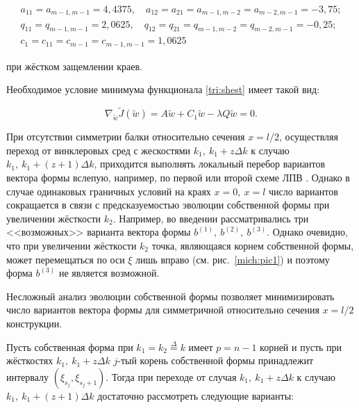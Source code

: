 $$

\begin{array}{l}

 a_{11}=a_{m-1,m-1}=4,4375,\quad  a_{12}=a_{21}=a_{m-1,m-2}=a_{m-2,m-1}=-3,75;

\\

q_{11}=q_{m-1,m-1}=2,0625,\quad q_{12}=q_{21}=q_{m-1,m-2}=q_{m-2,m-1}=-0,25;

\\

c_1=c_{11}=c_{m-1}=c_{m-1,m-1}=1,0625

\end{array}

$$

при жёстком защемлении краев.



Необходимое условие минимума функционала \eqref{tri:shest} имеет такой вид:

$$

\nabla_{\tilde{w}}\tilde{J}(\tilde{w})=A\tilde{w}+C_1\tilde{w}-\lambda Q\tilde{w}=0.

$$



При отсутствии симметрии балки относительно сечения $x=l/2$, осуществляя переход от винклеровых сред с жескостями $k_1,\ k_1+z\Delta k$ к случаю $k_1,\ k_1+(z+1)\Delta k$, приходится выполнять локальный перебор вариантов вектора формы вслепую, например, по первой или второй схеме ЛПВ \cite{mich-1}. Однако в случае одинаковых граничных условий на краях $x=0,\ x=l$ число вариантов сокращается в связи с предсказуемостью эволюции собственной формы при увеличении жёсткости $k_2$. Например, во введении рассматривались три <<возможных>> варианта вектора формы $b^{(1)},\ b^{(2)},\ b^{(3)}$. Однако очевидно, что при увеличении жёсткости $k_2$ точка, являющаяся корнем собственной формы, может перемещаться по оси $\xi$ лишь вправо (см. рис.~\ref{mich:pic1}) и поэтому форма $b^{(3)}$ не является возможной.



Несложный анализ эволюции собственной формы позволяет минимизировать число вариантов вектора формы для симметричной относительно сечения $x=l/2$ конструкции.



Пусть собственная форма при $k_1=k_2\stackrel{\Delta}{=}k$ имеет $p=n-1$ корней и пусть при жёсткостях $k_1,\ k_1+z\Delta k$ $j$-тый корень собственной формы принадлежит интервалу $(\xi_{s_j}, \xi_{s_j+1})$. Тогда при переходе от случая $k_1,\ k_1+z\Delta k$ к случаю $k_1,\ k_1+(z+1)\Delta k$ достаточно рассмотреть следующие варианты:



